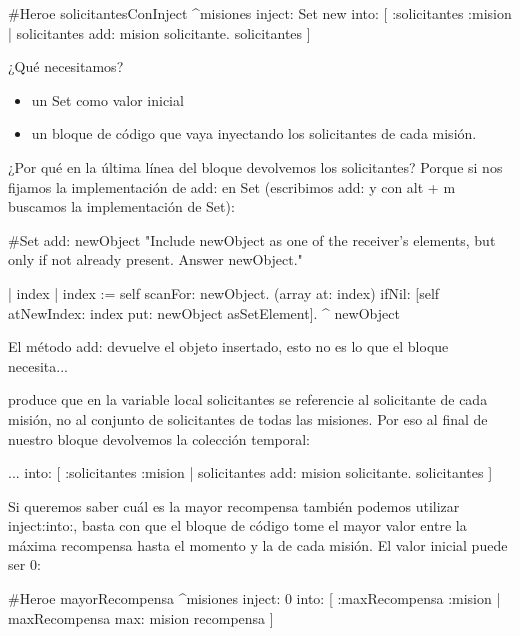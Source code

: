 \documentclass[a4paper,12pt]{book}
\begin{document}
\begin{code}
#Heroe
solicitantesConInject
   ^misiones inject: Set new 
             into: [ :solicitantes :mision | 
	             solicitantes add: mision solicitante. 
	             solicitantes  ] 
\end{code}

¿Qué necesitamos?
\\
\begin{itemize}
 \item un Set como valor inicial
 \item un bloque de código que vaya inyectando los solicitantes de cada misión. 
\end{itemize}

¿Por qué en la última línea del bloque devolvemos los solicitantes? Porque si nos fijamos la implementación de
add: en Set (escribimos add: y con alt + m buscamos la implementación de Set):

\begin{code}
#Set
add: newObject
	"Include newObject as one of the receiver's elements, but only if
	not already present. Answer newObject."

	| index |
	index := self scanFor: newObject.
	(array at: index) ifNil: [self atNewIndex: index put: newObject asSetElement].
	^ newObject
\end{code}

El método add: devuelve el objeto insertado, esto no es lo que el bloque necesita...

\begin{code}
\end{code}

produce que en la variable local solicitantes se referencie al solicitante de cada misión, no al conjunto de
solicitantes de todas las misiones. Por eso al final de nuestro bloque devolvemos la colección temporal:

\begin{code}
          ... into: [ :solicitantes :mision | 
	             solicitantes add: mision solicitante. 
	             solicitantes  ] 
\end{code}

Si queremos saber cuál es la mayor recompensa también podemos utilizar inject:into:, basta
con que el bloque de código tome el mayor valor entre la máxima recompensa hasta el momento y
la de cada misión. El valor inicial puede ser 0:

\begin{code}
#Heroe
mayorRecompensa
   ^misiones inject: 0
             into: [ :maxRecompensa :mision | maxRecompensa max: mision recompensa ] 
\end{code}
\end{document}
